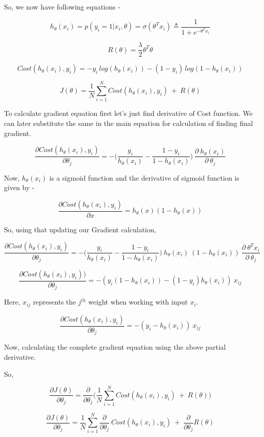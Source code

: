 So, we now have following equations - 


$$ h_\theta(x_i) = p(y_i = 1|x_i,\theta) =  \sigma(\theta^Tx_i) \triangleq \dfrac{1}{1 + e^{-\theta^Tx_{i}}} $$

$$ R(\theta) = \dfrac{\lambda}{2}\theta^T\theta$$

$$ Cost(h_\theta(x_i), y_i) = -y_i\,log(h_\theta(x_i)) - (1-y_i)\,log(1-h_\theta(x_i))$$

$$J(\theta) = \frac{1}{N}\sum_{i=1}^{N}Cost(h_\theta(x_i), y_i) \ + \  R(\theta)$$

To calculate gradient equation first let's just find derivative of Cost function. We can later substitute the same in the main equation for calculation of finding final gradient. 

$$ \frac{\partial Cost(h_\theta(x_i), y_i)}{\partial \theta_j} = -\Big(\frac{y_i}{h_\theta(x_i)} - \frac{1- y_i}{1 - h_\theta(x_i)}\Big) \ \frac{\partial \ h_\theta(x_i)}{\partial \ \theta_j} $$

Now, $h_\theta(x_i)$ is a sigmoid function and the derivative of sigmoid function is given by - 

$$ \frac{\partial Cost(h_\theta(x_i), y_i)}{\partial x} = h_\theta(x)(1-h_\theta(x))$$

So, using that updating our Gradient calculation, 

$$ \frac{\partial Cost(h_\theta(x_i), y_i)}{\partial \theta_j} = -\Big(\frac{y_i}{h_\theta(x_i)} - \frac{1- y_i}{1 - h_\theta(x_i)}\Big) \ h_\theta(x_i) \ (1-h_\theta(x_i)) \ \frac{\partial \ \theta^Tx_i}{\partial \ \theta_j} $$


$$ \frac{\partial Cost(h_\theta(x_i), y_i))}{\partial \theta_j} = -(y_i(1-h_\theta(x_i)) - (1-y_i)h_\theta(x_i)) \ x_{ij} $$

Here, $x_{ij}$ represents the $j^{th}$ weight when working with input $x_i$.    

$$ \frac{\partial Cost(h_\theta(x_i), y_i)}{\partial \theta_j} = -(y_i - h_\theta(x_i)) \ x_{ij} $$

Now, calculating the complete gradient equation using the above partial derivative. 

So, 

$$ \frac{\partial J(\theta)}{\partial \theta_j} = \frac{\partial}{\partial \theta_j} \Big(\frac{1}{N}\sum_{i=1}^{N}Cost(h_\theta(x_i), y_i) \ + \  R(\theta)\Big)$$


$$ \frac{\partial J(\theta)}{\partial \theta_j} =\frac{1}{N}\sum_{i=1}^{N} \frac{\partial}{\partial \theta_j} \ Cost(h_\theta(x_i), y_i) \ + \ \frac{\partial}{\partial \theta_j} R(\theta)$$


